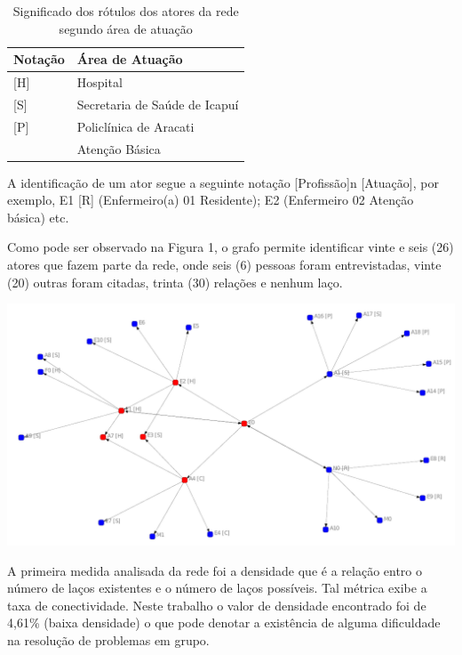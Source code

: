 \begin{table}[]
\centering
\caption{Significado dos rótulos dos atores da rede segundo área de atuação}
\label{graph-place}
\begin{tabular}{|l|l|}
\hline
Notação & Área de Atuação                       \\ \hline
{[}H{]} & Hospital                      \\ \hline
{[}S{]} & Secretaria de Saúde de Icapuí \\ \hline
{[}P{]} & Policlínica de Aracati        \\ \hline
        & Atenção Básica                \\ \hline
\end{tabular}
\end{table}

A identificação de um ator segue a seguinte notação [Profissão]n [Atuação], por exemplo, E1 [R] (Enfermeiro(a) 01 Residente); E2 (Enfermeiro 02 Atenção básica) etc.

Como pode ser observado na Figura 1, o grafo permite identificar vinte e seis (26) atores que fazem parte da rede, onde seis (6) pessoas foram entrevistadas, vinte (20) outras foram citadas, trinta (30) relações e nenhum laço.

\begin{center}
\includegraphics[width=15cm,keepaspectratio]{figuras/grafo-grupos.pdf}
\end{center}

A primeira medida analisada da rede foi a densidade que é a relação entro o número de laços existentes e o número de laços possíveis. Tal métrica exibe a taxa de conectividade. Neste trabalho o valor de densidade encontrado foi de 4,61\% (baixa densidade) o que pode denotar a existência de alguma dificuldade na resolução de problemas em grupo.

